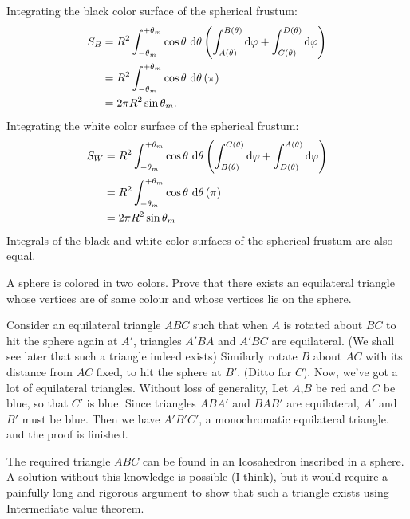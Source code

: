 \begin{solution}[name={Solution by Yetti}]
	Integrating the black color surface of the spherical frustum:
	\begin{align*}
		S_{B} &= R^2 \int_{ - \theta_m}^{ + \theta_m} \cos \theta\ \text d\theta \left( \int_{A(\theta)}^{B(\theta)} \text d\varphi + \int_{C(\theta)}^{D(\theta)} \text d\varphi \right)\\
		&= R^2 \int_{ - \theta_m}^{ + \theta_m} \cos \theta\ \text d\theta \left( \pi \right)\\
		& = 2 \pi R^2 \sin \theta_m.
	\end{align*}
	Integrating the white color surface of the spherical frustum:
	\begin{align*}
		S_{W} &= R^2 \int_{ - \theta_m}^{ + \theta_m} \cos \theta\ \text d\theta \left( \int_{B(\theta)}^{C(\theta)} \text d\varphi + \int_{D(\theta)}^{A(\theta)} \text d\varphi \right) \\
		&=  R^2 \int_{ - \theta_m}^{ + \theta_m} \cos \theta\ \text d\theta \left( \pi \right)\\
		& = 2 \pi R^2 \sin \theta_m
	\end{align*}
	Integrals of the black and white color surfaces of the spherical frustum are also equal.
\end{solution}





\begin{question}[name={Sphere Coloring by Goutham}]
	A sphere is colored in two colors. Prove that there exists an equilateral triangle whose vertices are of same colour and whose vertices lie on the sphere.
\end{question}





\begin{solution}[name={Solution by Keyree10}] 
	Consider an equilateral triangle $ ABC$ such that when $ A$ is rotated about $ BC$ to hit the sphere again at $ A'$, triangles $ A'BA$ and $ A'BC$ are equilateral. (We shall see later that such a triangle indeed exists)
	Similarly rotate $ B$ about $ AC$ with its distance from $ AC$ fixed, to hit the sphere at $ B'$. (Ditto for $ C$). Now, we've got a lot of equilateral triangles.
	Without loss of generality, Let $ A$,$ B$ be red and $ C$ be blue, so that $ C'$ is blue.
	Since triangles $ ABA'$ and $ BAB'$ are equilateral, $ A'$ and $ B'$ must be blue. Then we have $ A'B'C'$, a monochromatic equilateral triangle. and the proof is finished.
	
	The required triangle $ ABC$ can be found in an Icosahedron inscribed in a sphere. A solution without this knowledge is possible (I think), but it would require a painfully long and rigorous argument to show that such a triangle exists using Intermediate value theorem.
\end{solution}






